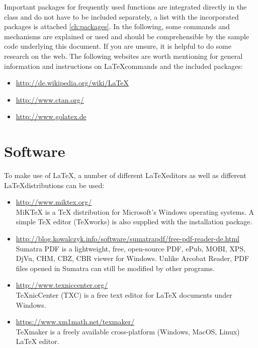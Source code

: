 Important packages for frequently used functions are integrated directly in the class and do not have to be included separately, a list with the incorporated packages is attached \cref{ch:packages}. 
In the following, some commands and mechanisms are explained or used and should be comprehensible by the sample code underlying this document.
If you are unsure, it is helpful to do some research on the web. The following websites are worth mentioning for general information and instructions on \LaTeX commands and the included packages:

\begin{itemize}
	\item \href{http://de.wikipedia.org/wiki/LaTeX}{http://de.wikipedia.org/wiki/LaTeX}
    \item \href{http://www.ctan.org/}{http://www.ctan.org/}
    \item \href{http://www.golatex.de}{http://www.golatex.de}
\end{itemize}

\section{Software}
\label{sec:software}

To make use of \LaTeX, a number of different \LaTeX editors as well as different \LaTeX distributions can be used:
\begin{itemize}
	\item \href{http://www.miktex.org/}{http://www.miktex.org/}\\
	MiKTeX is a TeX distribution for Microsoft's Windows operating systems. A simple TeX editor (TeXworks) is also supplied with the installation package.
	\item \href{http://blog.kowalczyk.info/software/sumatrapdf/free-pdf-reader-de.html}{http://blog.kowalczyk.info/software/sumatrapdf/free-pdf-reader-de.html}\\
	Sumatra PDF is a lightweight, free, open-source PDF, ePub, MOBI, XPS, DjVu, CHM, CBZ, CBR viewer for Windows. Unlike Arcobat Reader, PDF files opened in Sumatra can still be modified by other programs.
	\item \href{http://www.texniccenter.org/}{http://www.texniccenter.org/}\\
	TeXnicCenter (TXC) is a free text editor for LaTeX documents under Windows.
	\item \href{https://www.xm1math.net/texmaker/}{https://www.xm1math.net/texmaker/}\\
	TeXmaker is a freely available cross-platform (Windows, MacOS, Linux) LaTeX editor.
\end{itemize}

